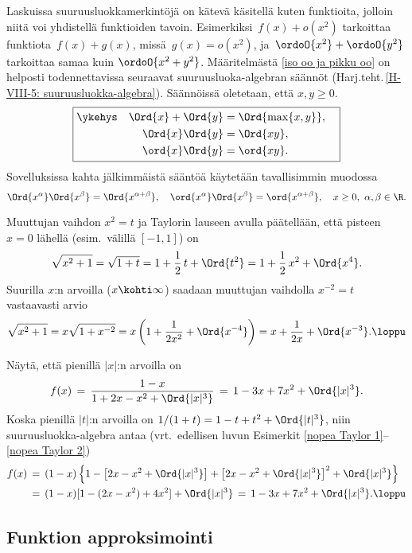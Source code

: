 Laskuissa suuruusluokkamerkintöjä on kätevä käsitellä kuten funktioita, jolloin niitä voi 
yhdistellä funktioiden tavoin. Esimerkiksi $\,f(x)+o(x^2)$ tarkoittaa funktiota $\,f(x)+g(x)$,
missä $\,g(x)=o(x^2)$, ja $\,\ordoO{x^2}+\ordoO{y^2}$ tarkoittaa samaa kuin $\ordoO{x^2+y^2}$.
Määritelmästä \ref{iso oo ja pikku oo} on helposti todennettavissa seuraavat
suuruusluoka-algebran säännöt (Harj.teht.\,\ref{H-VIII-5: suuruusluokka-algebra}). Säännöissä
oletetaan, että $x,y \ge 0$.
\[ \boxed{ \begin{aligned} 
\ykehys\quad \Ord{x}+\Ord{y} &= \Ord{\max\{x,y\}}, \quad \\
\Ord{x}\Ord{y}               &= \Ord{xy}, \quad \\
\ord{x}\Ord{y}               &= \ord{xy}. \quad
           \end{aligned} } \]
Sovelluksissa kahta jälkimmäistä sääntöä käytetään tavallisimmin muodossa
\[
\Ord{x^\alpha}\Ord{x^\beta}=\Ord{x^{\alpha+\beta}}, \quad
\ord{x^\alpha}\Ord{x^\beta}=\ord{x^{\alpha+\beta}}, \quad x \ge 0,\ \alpha,\beta\in\R.
\]
\begin{Exa} Muuttujan vaihdon $x^2=t$ ja Taylorin lauseen avulla päätellään, että pisteen
$x=0$ lähellä (esim.\ välillä $[-1,1]$) on
\[
\sqrt{x^2+1} = \sqrt{1+t} = 1+\frac{1}{2}\,t + \Ord{t^2} = 1+\frac{1}{2}\,x^2+\Ord{x^4}.
\]
Suurilla $x$:n arvoilla ($x\kohti\infty$) saadaan muuttujan vaihdolla $x^{-2}=t$ vastaavasti
arvio
\[
\sqrt{x^2+1} = x\sqrt{1+x^{-2}} = x\left(1+\frac{1}{2x^2}+\Ord{x^{-4}}\right)
                                = x+\frac{1}{2x}+\Ord{x^{-3}}. \loppu
\]
\end{Exa}
\begin{Exa} Näytä, että pienillä $|x|$:n arvoilla on
\[
f(x) \,=\, \frac{1-x}{1+2x-x^2+\Ord{|x|^3}} \,=\,1-3x+7x^2+\Ord{|x|^3}.
\]
\ratk Koska pienillä $|t|$:n arvoilla on $1/(1+t)=1-t+t^2+\Ord{|t|^3}$, niin
suuruusluokka-algebra antaa
(vrt.\ edellisen luvun Esimerkit \ref{nopea Taylor 1}--\ref{nopea Taylor 2})
\begin{align*}
f(x)\,&=\, (1-x)\left\{1-\left[2x-x^2+\Ord{|x|^3}\right]
                        +\left[2x-x^2+\Ord{|x|^3}\right]^2+\Ord{|x|^3}\right\} \\
    \,&=\, (1-x)[1-(2x-x^2)+4x^2]+\Ord{|x|^3} \,=\, 1-3x+7x^2+\Ord{|x|^3}. \loppu
\end{align*}
\end{Exa}

\subsection{Funktion approksimointi}

